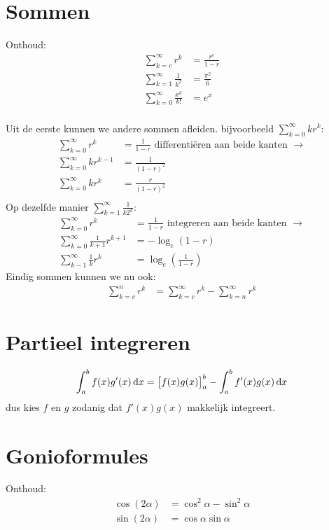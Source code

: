 \documentclass{thomasclass}
\begin{document}
	\tableofcontents
	\section{Sommen}
 		Onthoud:
 		\begin{align*}
 			\sum_{k=c}^{\infty} r^k &= \frac{r^c}{1-r} \\
 			\sum_{k=1}^{\infty} \frac{1}{k^2} &= \frac{\pi^2}{6} \\
 			\sum_{k=0}^\infty \frac{x^k}{k!} &= e^x \\
 		\end{align*}
 		
 		Uit de eerste kunnen we andere sommen afleiden. bijvoorbeeld 
 		$\displaystyle \sum_{k=0}^{\infty} kr^k: $
 		\begin{align*}
 				\sum_{k=0}^{\infty} r^k &= \frac{1}{1-r} \text { differenti\"eren aan beide kanten } \to \\
 				\sum_{k=0}^{\infty} kr^{k-1} &= \frac{1}{(1-r)^2} \\
 				\sum_{k=0}^{\infty} kr^k &= \frac{r}{(1-r)^2} \\
 		\end{align*}
 		Op dezelfde manier $\displaystyle \sum_{k=1}^{\infty} \frac{1}{k2^k}$:
 		\begin{align*}
 				\sum_{k=0}^{\infty} r^k &= \frac{1}{1-r} \text { integreren aan beide kanten } \to \\
 				\sum_{k=0}^{\infty} \frac{1}{k+1} r^{k+1} &= -\log_e (1-r) \\
 				\sum_{k-1}^\infty \frac{1}{k} r^k &= \log_e (\frac{1}{1-r})
 		\end{align*}
 		Eindig sommen kunnen we nu ook:
 		\begin{align*}
 			\sum_{k=c}^n r^k &= \sum_{k=c}^\infty r^k - \sum_{k=n}^\infty r^k
 		\end{align*}
	\section{Partieel integreren}
		\[ 
			\int_a^b f(x) g'(x) \mathop{}\!\mathrm{d} x = \big[f(x)g(x)\big]_a^b - \int_a^b f'(x) g(x) \mathop{}\!\mathrm{d} x
		 \]
		 dus kies $f$ en $g$ zodanig dat $f'(x)g(x)$ makkelijk integreert.
 			 
	 \section{Gonioformules}
		 Onthoud:
 		 \begin{align*}
 			 \cos (2\alpha) &= \cos^2 \alpha - \sin^2 \alpha \\
 			 \sin (2\alpha) &= \cos \alpha \sin \alpha 
 		 \end{align*}
 		 
\end{document}
